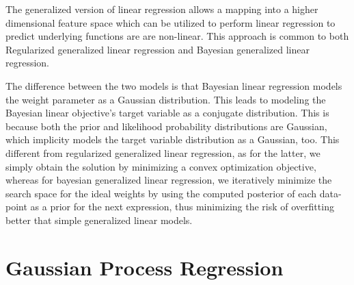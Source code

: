 \documentclass[parskip=full]{scrartcl}
\begin{document}
            The generalized version of linear regression allows a mapping into a higher dimensional feature space which can be utilized to perform linear regression to predict underlying functions are are non-linear. This approach is common to both Regularized generalized linear regression and Bayesian generalized linear regression.

            The difference between the two models is that Bayesian linear regression models the weight parameter as a Gaussian distribution. This leads to modeling the Bayesian linear objective's target variable as a conjugate distribution. This is because both the prior and likelihood probability distributions are Gaussian, which implicity models the target variable distribution as a Gaussian, too. This different from regularized generalized linear regression, as for the latter, we simply obtain the solution by minimizing a convex optimization objective, whereas for bayesian generalized linear regression, we iteratively minimize the search space for the ideal weights by using the computed posterior of each data-point as a prior for the next expression, thus minimizing the risk of overfitting better that simple generalized linear models.
        
    

    \section{Gaussian Process Regression} %
    \label{sec:gaussian_process_regression}
    

\end{document}
